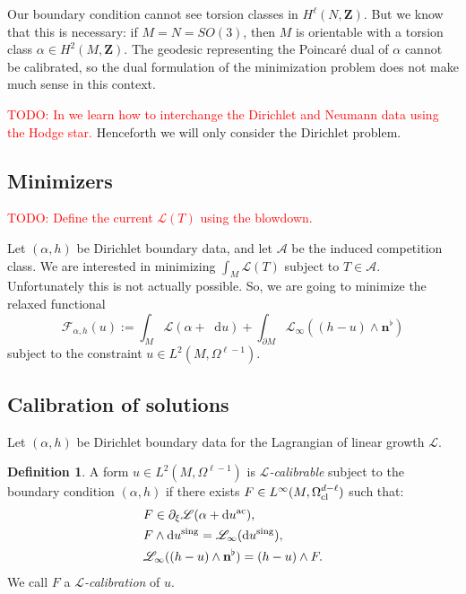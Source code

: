 \documentclass[reqno,11pt]{amsart}
\newcommand{\ZZ}{\mathbf{Z}}
\newcommand*\dif{\mathop{}\!\mathrm{d}}
\newcommand{\Lagrange}{\mathscr L}
\newcommand{\normal}{\mathbf n}
\newcommand{\dfn}[1]{\emph{#1}\index{#1}}
\newcommand{\ac}{\mathrm{ac}}
\newcommand{\sing}{\mathrm{sing}}
\theoremstyle{definition}
\newtheorem{definition}[theorem]{Definition}
\numberwithin{equation}{section}
\newcommand\todo[1]{\textcolor{red}{TODO: #1}}
\begin{document}
Our boundary condition cannot see torsion classes in $H^\ell(N, \ZZ)$.
But we know that this is necessary: if $M = N = SO(3)$, then $M$ is orientable with a torsion class $\alpha \in H^2(M, \ZZ)$.
The geodesic representing the Poincar\'e dual of $\alpha$ cannot be calibrated, so the dual formulation of the minimization problem does not make much sense in this context.

\todo{In \cite[Chapter 5, \S9]{taylor2010partial} we learn how to interchange the Dirichlet and Neumann data using the Hodge star.}
Henceforth we will only consider the Dirichlet problem.

\subsection{Minimizers}
\todo{Define the current $\Lagrange(T)$ using the blowdown.}

Let $(\alpha, h)$ be Dirichlet boundary data, and let $\mathscr A$ be the induced competition class.
We are interested in minimizing $\int_M \Lagrange(T)$ subject to $T \in \mathscr A$.
Unfortunately this is not actually possible.
So, we are going to minimize the relaxed functional
$$\mathcal F_{\alpha, h}(u) := \int_M \Lagrange(\alpha + \dif u) + \int_{\partial M} \Lagrange_\infty((h - u) \wedge \normal^\flat)$$
subject to the constraint $u \in L^2(M, \Omega^{\ell - 1})$.

\subsection{Calibration of solutions}
Let $(\alpha, h)$ be Dirichlet boundary data for the Lagrangian of linear growth $\Lagrange$.

\begin{definition}
A form $u \in L^2(M, \Omega^{\ell - 1})$ is \dfn{$\Lagrange$-calibrable} subject to the boundary condition $(\alpha, h)$ if there exists $F \in L^\infty(M, \Omega^{d - \ell}_{\rm cl})$ such that:
\begin{align}
&F \in \partial_\xi \Lagrange(\alpha + \dif u^\ac), \label{calibration is a subgradient} \\
&F \wedge \dif u^{\rm sing} = \Lagrange_\infty(\dif u^\sing), \label{calibration of singular part} \\
&\Lagrange_\infty((h - u) \wedge \normal^\flat) = (h - u) \wedge F.\label{calibration of boundary condition}
\end{align}
We call $F$ a \dfn{$\Lagrange$-calibration} of $u$.
\end{definition}
\end{document}
